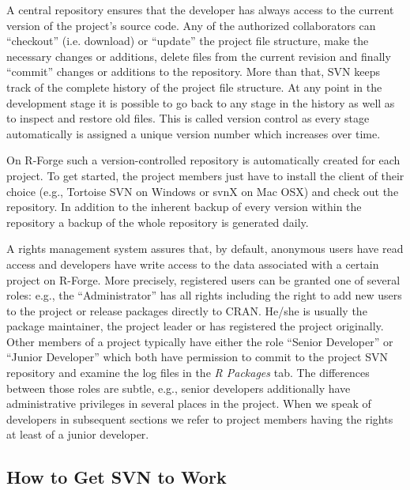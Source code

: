 \documentclass[a4paper]{article}
\newcommand{\tab}[1]{{\normalfont\textit{#1}}}
\newcommand{\proglang}[1]{\textsf{#1}}
\begin{document}
A central repository ensures that the developer
has always access to the current version of the project's source
code. Any of the authorized collaborators can ``checkout''
(i.e. download) or ``update'' the project
file structure, make the necessary changes or additions, delete
files from the current revision and finally ``commit'' changes or
additions to the repository. More than
that, SVN keeps track of the complete history of the project file
structure. At any point in the development stage it is possible to go
back to any stage in the history as well as to inspect and restore old
files. This is called version control as every stage automatically is
assigned a unique version number which increases over time. 

On \proglang{R}-Forge such a version-controlled repository is automatically
created for each project. To get started, the project members just
have to install the client of their choice (e.g., Tortoise SVN on
Windows or svnX on 
Mac OSX) and check out the repository. In addition to the inherent
backup of every version within the repository a backup of the whole
repository is generated daily. 

A rights management system assures that, by default, anonymous users
have read access and developers have write access to the data associated with 
a certain project on \proglang{R}-Forge. More precisely, registered users can
be granted one of several roles: e.g., the ``Administrator'' has
all rights including the right to 
add new users to the project or release packages directly to CRAN.
He/she is usually the package 
maintainer, the project leader or has registered the project originally.
Other members of a project typically have either the role ``Senior 
Developer'' or ``Junior Developer'' which both have permission to
commit to the project SVN repository and examine the log files in the 
\tab{R Packages} tab. The differences between those
roles are subtle, e.g., senior developers additionally have administrative
privileges in several places in the project.  
When we speak of developers in subsequent sections we refer to project
members having the rights at least of a junior developer.


\subsection{How to Get SVN to Work}
\label{sec:scmhowto}
\end{document}
